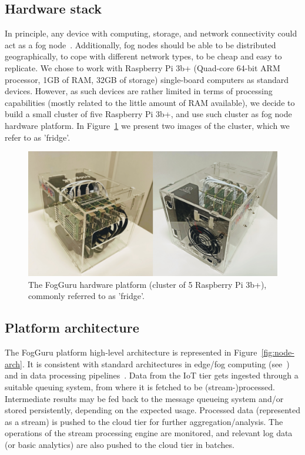 \subsection{Hardware stack}
In principle, any device with computing, storage, and network connectivity could act as a fog node~\cite{ciscoFog}. Additionally, fog nodes should be able to be distributed geographically, to cope with different network types, to be cheap and easy to replicate. We chose to work with Raspberry Pi 3b+ (Quad-core 64-bit ARM processor, 1GB of RAM, 32GB of storage) single-board computers as standard devices. However, as such devices are rather limited in terms of processing capabilities (mostly related to the little amount of RAM available), we decide to build a small cluster of five Raspberry Pi 3b+, and use such cluster as fog node hardware platform. In Figure~\ref{fig:fridge} we present two images of the cluster, which we refer to as 'fridge'.
\begin{figure}[htbp]
\centerline{
\includegraphics[width=1\linewidth]{figures/fog_pic.pdf}}
\caption{The FogGuru hardware platform (cluster of 5 Raspberry Pi 3b+), commonly referred to as 'fridge'.}
\label{fig:fridge}
\end{figure}


\subsection{Platform architecture}
The FogGuru platform high-level architecture is represented in Figure~\ref{fig:node-arch}. It is consistent with standard architectures in edge/fog computing (see~\cite{de2018distributed}) and in data processing pipelines~\cite{ismail2019manufacturing}. Data from the IoT tier gets ingested through a suitable queuing system, from where it is fetched to be (stream-)processed. Intermediate results may be fed back to the message queueing system and/or stored persistently, depending on the expected usage. Processed data (represented as a stream) is pushed to the cloud tier for further aggregation/analysis. The operations of the stream processing engine are monitored, and relevant log data (or basic analytics) are also pushed to the cloud tier in batches.


